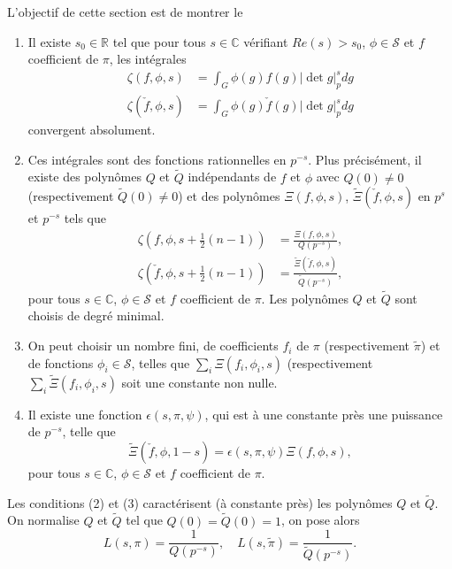 L'objectif de cette section est de montrer le
\begin{theoreme}
\label{thm_padique}
\begin{enumerate}
\item Il existe $s_0 \in \mathbb{R}$ tel que pour tous $s \in \mathbb{C}$ vérifiant $Re (s) > s_0$, $\phi \in \mathcal{S}$ et $f$ coefficient de $\pi$, les intégrales
\begin{align}
\zeta(f, \phi, s) &= \int_G \phi(g)f(g)|\det g|_p^s dg \\
\zeta(\check{f}, \phi, s) &= \int_G \phi(g)\check{f}(g)|\det g|_p^s dg
\end{align}
convergent absolument.
\item Ces intégrales sont des fonctions rationnelles en $p^{-s}$. Plus précisément, il existe des polynômes $Q$ et $\tilde{Q}$ indépendants de $f$ et $\phi$ avec $Q(0)\neq 0$ (respectivement $\tilde{Q}(0)\neq 0$) et des polynômes $\Xi(f, \phi, s)$, $\tilde{\Xi}(\check{f}, \phi, s)$ en $p^{s}$ et $p^{-s}$ tels que
\begin{align}
\zeta(f, \phi, s+\frac{1}{2}(n-1)) &= \frac{\Xi(f, \phi, s)}{Q(p^{-s})}, \\
\zeta(\check{f}, \phi, s+\frac{1}{2}(n-1)) &= \frac{\tilde{\Xi}(\check{f}, \phi, s)}{\tilde{Q}(p^{-s})},
\end{align}
pour tous $s \in \mathbb{C}$, $\phi \in \mathcal{S}$ et $f$ coefficient de $\pi$. Les polynômes $Q$ et $\tilde{Q}$ sont choisis de degré minimal.
\item On peut choisir un nombre fini, de coefficients $f_i$ de $\pi$ (respectivement $\tilde{\pi}$) et de fonctions $\phi_i \in \mathcal{S}$, telles que $\sum_i \Xi(f_i, \phi_i, s)$ (respectivement $\sum_i \tilde{\Xi}(f_i, \phi_i, s)$ soit une constante non nulle.
\item Il existe une fonction $\epsilon(s, \pi, \psi)$, qui est à une constante près une puissance de $p^{-s}$, telle que
\begin{equation}
\label{epsilon}
\tilde{\Xi}(\check{f}, \hat{\phi}, 1-s) = \epsilon(s, \pi, \psi)\Xi(f, \phi, s),
\end{equation}
pour tous $s\in \mathbb{C}$, $\phi \in \mathcal{S}$ et $f$ coefficient de $\pi$.
\end{enumerate}
\end{theoreme}

Les conditions (2) et (3) caractérisent (à constante près) les polynômes $Q$ et $\tilde{Q}$. On normalise $Q$ et $\tilde{Q}$ tel que $Q(0)=\tilde{Q}(0)=1$, on pose alors
\begin{equation}
L(s, \pi) = \frac{1}{Q(p^{-s})}, \quad L(s, \tilde{\pi}) = \frac{1}{\tilde{Q}(p^{-s})}.
\end{equation}

